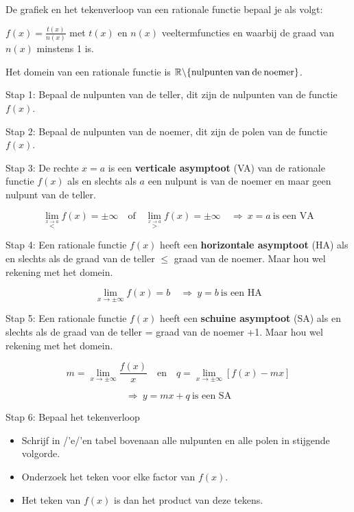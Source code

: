 \begin{framed}

De grafiek en het tekenverloop van een rationale functie bepaal je
als volgt:\medskip{}


${\displaystyle f(x)=\frac{t(x)}{n(x)}}$ met $t(x)$ en $n(x)$ veeltermfuncties
en waarbij de graad van $n(x)$ minstens 1 is.

Het domein van een rationale functie is $\mathbb{R\setminus}\textrm{\{nulpunten\:van\:de\:noemer\}}$.

Stap 1: Bepaal de nulpunten van de teller, dit zijn de nulpunten van
de functie $f(x)$.

Stap 2: Bepaal de nulpunten van de noemer, dit zijn de polen van de
functie $f(x)$.

Stap 3: De rechte $x=a$ is een \textbf{verticale asymptoot} (VA)
van de rationale functie $f(x)$ als en slechts als $a$ een nulpunt
is van de noemer en maar geen nulpunt van de teller.

\[
{\displaystyle {\displaystyle \lim_{\overset{x\rightarrow a}{<}}}f(x)=\pm\infty\quad\textrm{of}\quad{\displaystyle \lim_{\overset{x\rightarrow a}{>}}}f(x)=\pm\infty\quad\Rightarrow\:x=a\:\textrm{is een VA}}
\]


Stap 4: Een rationale functie $f(x)$ heeft een \textbf{horizontale
asymptoot} (HA) als en slechts als de graad van de teller \ensuremath{\le}
graad van de noemer. Maar hou wel rekening met het domein.

\[
{\displaystyle {\displaystyle \lim_{x\to\pm\infty}}f(x)=b\quad\Rightarrow\:y=b\:\textrm{is een HA}}
\]


Stap 5: Een rationale functie $f(x)$ heeft een \textbf{schuine asymptoot}
(SA) als en slechts als de graad van de teller = graad van de noemer
+1. Maar hou wel rekening met het domein.

\[
{\displaystyle m={\displaystyle \lim_{x\to\pm\infty}}\frac{f(x)}{x}\quad\textrm{en}\quad q={\displaystyle \lim_{x\to\pm\infty}}\left[f(x)-mx\right]}
\]


\[
{\displaystyle \Rightarrow\:y=mx+q\:\textrm{is een SA}}
\]


Stap 6: Bepaal het tekenverloop
\begin{itemize}
\item Schrijf in /'e/'en tabel bovenaan alle nulpunten en alle polen in stijgende
volgorde. 

\item Onderzoek het teken voor elke factor van $f(x)$.

\item Het teken van $f(x)$ is dan het product van deze tekens.

\end{itemize}
\end{framed}
